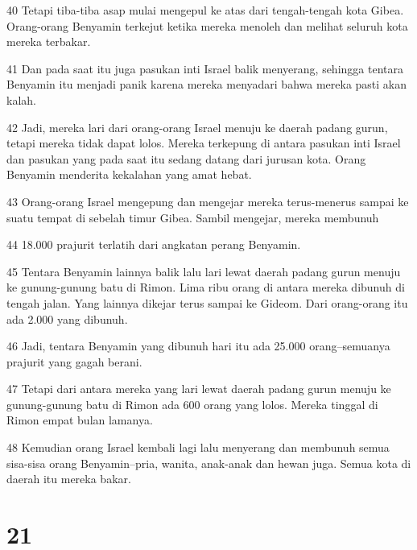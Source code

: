 \par 40 Tetapi tiba-tiba asap mulai mengepul ke atas dari tengah-tengah kota Gibea. Orang-orang Benyamin terkejut ketika mereka menoleh dan melihat seluruh kota mereka terbakar.
\par 41 Dan pada saat itu juga pasukan inti Israel balik menyerang, sehingga tentara Benyamin itu menjadi panik karena mereka menyadari bahwa mereka pasti akan kalah.
\par 42 Jadi, mereka lari dari orang-orang Israel menuju ke daerah padang gurun, tetapi mereka tidak dapat lolos. Mereka terkepung di antara pasukan inti Israel dan pasukan yang pada saat itu sedang datang dari jurusan kota. Orang Benyamin menderita kekalahan yang amat hebat.
\par 43 Orang-orang Israel mengepung dan mengejar mereka terus-menerus sampai ke suatu tempat di sebelah timur Gibea. Sambil mengejar, mereka membunuh
\par 44 18.000 prajurit terlatih dari angkatan perang Benyamin.
\par 45 Tentara Benyamin lainnya balik lalu lari lewat daerah padang gurun menuju ke gunung-gunung batu di Rimon. Lima ribu orang di antara mereka dibunuh di tengah jalan. Yang lainnya dikejar terus sampai ke Gideom. Dari orang-orang itu ada 2.000 yang dibunuh.
\par 46 Jadi, tentara Benyamin yang dibunuh hari itu ada 25.000 orang--semuanya prajurit yang gagah berani.
\par 47 Tetapi dari antara mereka yang lari lewat daerah padang gurun menuju ke gunung-gunung batu di Rimon ada 600 orang yang lolos. Mereka tinggal di Rimon empat bulan lamanya.
\par 48 Kemudian orang Israel kembali lagi lalu menyerang dan membunuh semua sisa-sisa orang Benyamin--pria, wanita, anak-anak dan hewan juga. Semua kota di daerah itu mereka bakar.

\chapter{21}

